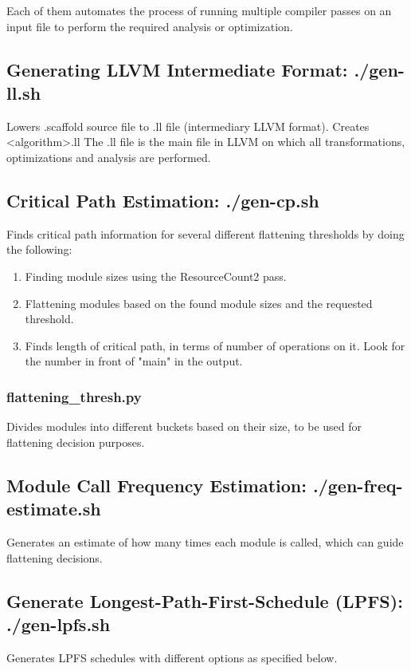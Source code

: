 Each of them automates the process of running multiple compiler passes on an input file to perform the required analysis or optimization.


\subsection{Generating LLVM Intermediate Format: ./gen-ll.sh}

Lowers .scaffold source file to .ll file (intermediary LLVM format). Creates <algorithm>.ll
The .ll file is the main file in LLVM on which all transformations, optimizations and analysis are performed.


\subsection{Critical Path Estimation: ./gen-cp.sh}

Finds critical path information for several different flattening thresholds by doing the following:
\begin{enumerate}
\item Finding module sizes using the ResourceCount2 pass.
\item Flattening modules based on the found module sizes and the requested threshold.
\item Finds length of critical path, in terms of number of operations on it. Look for the number in front of "main" in the output. 
\end{enumerate}

\subsubsection{flattening\_thresh.py} 
Divides modules into different buckets based on their size, to be used for flattening decision purposes.


\subsection{Module Call Frequency Estimation: ./gen-freq-estimate.sh}
Generates an estimate of how many times each module is called, which can guide flattening decisions.


\subsection{Generate Longest-Path-First-Schedule (LPFS): ./gen-lpfs.sh}
Generates LPFS schedules with different options as specified below.

